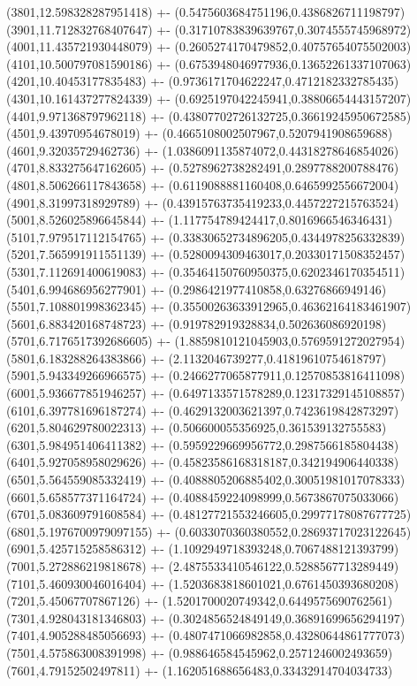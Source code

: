 {(3801,12.598328287951418) +- (0.5475603684751196,0.4386826711198797)
(3901,11.712832768407647) +- (0.31710783839639767,0.3074555745968972)
(4001,11.435721930448079) +- (0.2605274170479852,0.40757654075502003)
(4101,10.500797081590186) +- (0.6753948046977936,0.13652261337107063)
(4201,10.40453177835483) +- (0.9736171704622247,0.4712182332785435)
(4301,10.161437277824339) +- (0.6925197042245941,0.38806654443157207)
(4401,9.971368797962118) +- (0.43807702726132725,0.36619245950672585)
(4501,9.43970954678019) +- (0.4665108002507967,0.5207941908659688)
(4601,9.32035729462736) +- (1.0386091135874072,0.44318278646854026)
(4701,8.833275647162605) +- (0.5278962738282491,0.2897788200788476)
(4801,8.506266117843658) +- (0.6119088881160408,0.6465992556672004)
(4901,8.31997318929789) +- (0.43915763735419233,0.4457227215763524)
(5001,8.526025896645844) +- (1.117754789424417,0.8016966546346431)
(5101,7.979517112154765) +- (0.33830652734896205,0.4344978256332839)
(5201,7.565991911551139) +- (0.5280094309463017,0.20330171508352457)
(5301,7.112691400619083) +- (0.35464150760950375,0.6202346170354511)
(5401,6.994686956277901) +- (0.2986421977410858,0.63276866949146)
(5501,7.108801998362345) +- (0.35500263633912965,0.46362164183461907)
(5601,6.883420168748723) +- (0.919782919328834,0.502636086920198)
(5701,6.7176517392686605) +- (1.8859810121045903,0.5769591272027954)
(5801,6.183288264383866) +- (2.1132046739277,0.41819610754618797)
(5901,5.943349266966575) +- (0.2466277065877911,0.12570853816411098)
(6001,5.936677851946257) +- (0.6497133571578289,0.12317329145108857)
(6101,6.397781696187274) +- (0.4629132003621397,0.7423619842873297)
(6201,5.804629780022313) +- (0.506600055356925,0.361539132755583)
(6301,5.984951406411382) +- (0.5959229669956772,0.2987566185804438)
(6401,5.927058958029626) +- (0.45823586168318187,0.342194906440338)
(6501,5.564559085332419) +- (0.4088805206885402,0.30051981017078333)
(6601,5.658577371164724) +- (0.4088459224098999,0.5673867075033066)
(6701,5.083609791608584) +- (0.48127721553246605,0.29977178087677725)
(6801,5.1976700979097155) +- (0.6033070360380552,0.28693717023122645)
(6901,5.425715258586312) +- (1.1092949718393248,0.7067488121393799)
(7001,5.272886219818678) +- (2.4875533410546122,0.5288567713289449)
(7101,5.460930046016404) +- (1.5203683818601021,0.6761450393680208)
(7201,5.45067707867126) +- (1.5201700020749342,0.6449575690762561)
(7301,4.928043181346803) +- (0.3024856524849149,0.36891699656294197)
(7401,4.905288485056693) +- (0.4807471066982858,0.43280644861777073)
(7501,4.575863008391998) +- (0.988646584545962,0.2571246002493659)
(7601,4.79152502497811) +- (1.162051688656483,0.33432914704034733)
}

